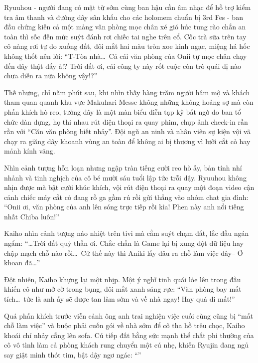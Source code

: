 \documentclass[../main.tex]{subfiles}
\begin{document}
Ryuuhou - người đang có mặt từ sớm cùng ban hậu cần âm nhạc để hỗ trợ kiểm tra âm thanh và đường dây sân khấu cho các holomem chuẩn bị 3rd Fes - ban đầu chứng kiến cả một mảng văn phòng mọc chân xé gió húc tung rào chắn an toàn thì sốc đến mức suýt đánh rơi chiếc tai nghe trên cổ. Cốc trà sữa trên tay cô nàng rơi tự do xuống đất, đôi mắt hai màu tròn xoe kinh ngạc, miệng há hốc không thốt nên lời: ``T-Tòa nhà\dots\ Cả cái văn phòng của Onii tự mọc chân chạy đến đây thật đấy à!? Trời đất ơi, cái công ty này rốt cuộc còn trò quái dị nào chưa diễn ra nữa không vậy!?''

Thế nhưng, chỉ năm phút sau, khi nhìn thấy hàng trăm người hâm mộ và khách tham quan quanh khu vực Makuhari Messe không những không hoảng sợ mà còn phấn khích hò reo, tưởng đây là một màn biểu diễn tạp kỹ bất ngờ do ban tổ chức dàn dựng, họ thi nhau rút điện thoại ra quay phim, chụp ảnh check-in rần rần với ``Căn văn phòng biết nhảy''. Đội ngũ an ninh và nhân viên sự kiện vội vã chạy ra giăng dây khoanh vùng an toàn để không ai bị thương vì lưỡi cắt cỏ hay mảnh kính văng.

Nhìn cảnh tượng hỗn loạn nhưng ngập tràn tiếng cười reo hò ấy, bản tính nhí nhảnh và tinh nghịch của cô bé mười sáu tuổi lập tức trỗi dậy. Ryuuhou không nhịn được mà bật cười khúc khích, vội rút điện thoại ra quay một đoạn video cận cảnh chiếc máy cắt cỏ đang rồ ga gầm rú rồi gửi thẳng vào nhóm chat gia đình: ``Onii ơi, văn phòng của anh lên sóng trực tiếp rồi kìa! Phen này anh nổi tiếng nhất Chiba luôn!''

Kaiho nhìn cảnh tượng náo nhiệt trên tivi mà cằm suýt chạm đất, lắc đầu ngán ngẩm: ``\dots Trời đất quỷ thần ơi. Chắc chắn là Game lại bị xung đột dữ liệu hay chập mạch chỗ nào rồi\dots\ Cứ thế này thì Aniki lấy đâu ra chỗ làm việc đây-- Ơ khoan đã\dots''

Đột nhiên, Kaiho khựng lại một nhịp. Một ý nghĩ tinh quái lóe lên trong đầu khiến cô như mở cờ trong bụng, đôi mắt xanh sáng rực: ``Văn phòng bay mất tích\dots\ tức là anh ấy sẽ được tan làm sớm và về nhà ngay! Hay quá đi mất!''

Quá phấn khích trước viễn cảnh ông anh trai nghiện việc cuối cùng cũng bị ``mất chỗ làm việc'' và buộc phải cuốn gói về nhà sớm để cô tha hồ trêu chọc, Kaiho khoái chí nhảy cẫng lên sofa. Cú tiếp đất bằng sức mạnh thể chất phi thường của cô vô tình làm cả phòng khách rung chuyển một cú nhẹ, khiến Ryujin đang ngủ say giật mình thót tim, bật dậy ngơ ngác: ``''
\end{document}
